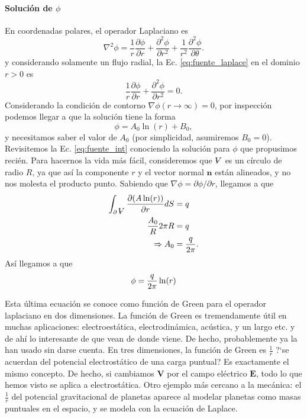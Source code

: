 \paragraph{Solución de $\phi$}
En coordenadas polares, el operador Laplaciano es 
%
\begin{equation}
\nabla^2\phi = \frac{1}{r}\frac{\partial\phi}{\partial r} + \frac{\partial^2\phi}{\partial r^2} + \frac{1}{r^2}\frac{\partial^2\phi}{\partial\theta}.
\end{equation}
%
y considerando solamente un flujo radial, la Ec. \eqref{eq:fuente_laplace} en el dominio $r>0$ es
%
\begin{equation}
\frac{1}{r}\frac{\partial\phi}{\partial r} + \frac{\partial^2\phi}{\partial r^2} = 0.
\end{equation}
%
Considerando la condición de contorno $\nabla\phi(r\to\infty)=0$, por inspección podemos llegar a que la solución tiene la forma 
%
\begin{equation}
\phi = A_0\ln(r) + B_0,
\end{equation}
%
y necesitamos saber el valor de $A_0$ (por simplicidad, asumiremos $B_0=0$).
Revisitemos la Ec. \eqref{eq:fuente_int} conociendo la solución para $\phi$ que propusimos recién.
Para hacernos la vida más fácil, consideremos que $\vol$ es un círculo de radio $R$, ya que así la componente $r$ y el vector normal $\mathbf{n}$ están alineados, y no nos molesta el producto punto.
Sabiendo que $\nabla\phi=\partial\phi/\partial r$, llegamos a que
%
\begin{align}
\int_{\partial\vol}\frac{\partial(A\ln(r))}{\partial{r}}dS &= q\nonumber\\
\frac{A_0}{R}2\pi R&= q\nonumber\\
\Rightarrow A_0 &= \frac{q}{2\pi}.
\end{align}
%
Así llegamos a que
\begin{equation}
\phi=\frac{q}{2\pi}\ln(r)\nonumber\\
\end{equation}

Esta última ecuación se conoce como función de Green para el operador laplaciano en dos dimensiones. 
La función de Green es tremendamente útil en muchas aplicaciones: electroestática, electrodinámica, acústica, y un largo etc. y de ahí lo interesante de que vean de donde viene.
De hecho, probablemente ya la han usado sin darse cuenta.
En tres dimensiones, la función de Green es $\frac{1}{r}$ \mbox{?`}se acuerdan del potencial electrostático de una carga puntual? Es exactamente el mismo concepto.
De hecho, si cambiamos $\mathbf{V}$ por el campo eléctrico $\mathbf{E}$, todo lo que hemos visto se aplica a electrostática.
Otro ejemplo más cercano a la mecánica: el $\frac{1}{r}$ del potencial gravitacional de planetas aparece al modelar planetas como masas puntuales en el espacio, y se modela con la ecuación de Laplace.

